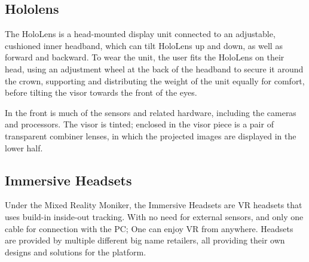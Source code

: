     \subsection{Hololens}
    The HoloLens is a head-mounted display unit connected to an adjustable, cushioned inner headband, which can tilt HoloLens up and down, as well as forward and backward. To wear the unit, the user fits the HoloLens on their head, using an adjustment wheel at the back of the headband to secure it around the crown, supporting and distributing the weight of the unit equally for comfort, before tilting the visor towards the front of the eyes.

    In the front is much of the sensors and related hardware, including the cameras and processors. The visor is tinted; enclosed in the visor piece is a pair of transparent combiner lenses, in which the projected images are displayed in the lower half. %

    \subsection{Immersive Headsets}
    Under the Mixed Reality Moniker, the Immersive Headsets are VR headsets that uses build-in inside-out tracking. With no need for external sensors, and only one cable for connection with the PC; One can enjoy VR from anywhere. 
    Headsets are provided by multiple different big name retailers, all providing their own designs and solutions for the platform.
